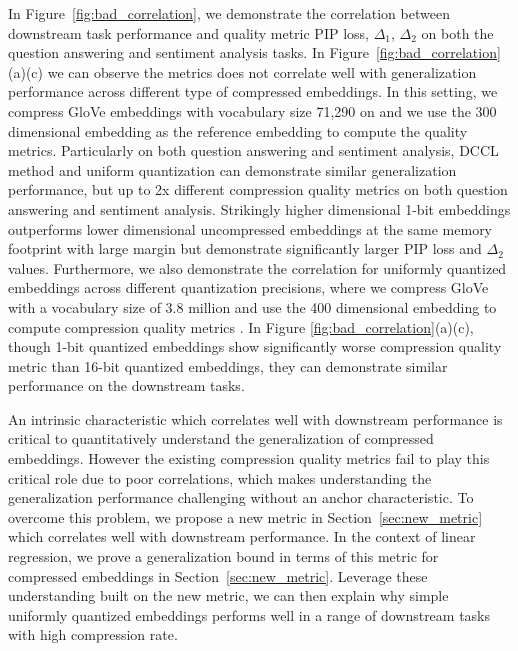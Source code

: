 In Figure~\ref{fig:bad_correlation}, we demonstrate the correlation between downstream task performance and quality metric PIP loss, $\Delta_1$, $\Delta_2$ on both the question answering and sentiment analysis tasks. In Figure~\ref{fig:bad_correlation} (a)(c) we can observe the metrics does not correlate well with generalization performance across different type of compressed embeddings. In this setting, we compress GloVe embeddings with vocabulary size 71,290 on  and we use the 300 dimensional embedding as the reference embedding to compute the quality metrics. Particularly on both question answering and sentiment analysis, DCCL method and uniform quantization can demonstrate similar generalization performance, but up to 2x different compression quality metrics on both question answering and sentiment analysis. Strikingly higher dimensional 1-bit embeddings outperforms lower dimensional uncompressed embeddings at the same memory footprint with large margin but demonstrate significantly larger PIP loss and $\Delta_2$ values. Furthermore, we also demonstrate the correlation for uniformly quantized embeddings across different quantization precisions, where we compress GloVe with a vocabulary size of 3.8 million and use the 400 dimensional embedding to compute compression quality metrics . In Figure \ref{fig:bad_correlation}(a)(c), though 1-bit quantized embeddings show significantly worse compression quality metric than 16-bit quantized embeddings, they can demonstrate similar performance on the downstream tasks. 

An intrinsic characteristic which correlates well with downstream performance is critical to quantitatively understand the generalization of compressed embeddings. However the existing compression quality metrics fail to play this critical role due to poor correlations, which makes understanding the generalization performance challenging without an anchor characteristic. To overcome this problem, we propose a new metric in Section~\ref{sec:new_metric} which correlates well with downstream performance. In the context of linear regression, we prove a generalization bound in terms of this metric for compressed embeddings in Section~\ref{sec:new_metric}. Leverage these understanding built on the new metric, we can then explain why simple uniformly quantized embeddings performs well in a range of downstream tasks with high compression rate.

 



